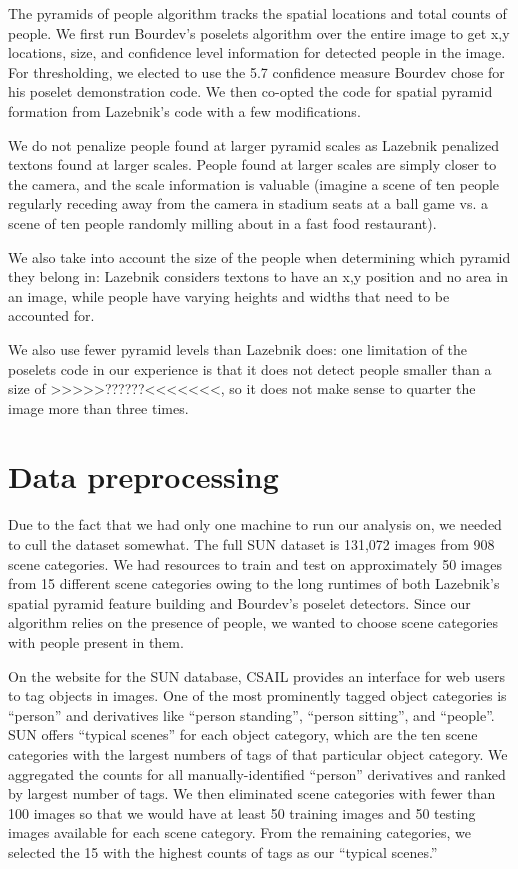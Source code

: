 \documentclass[11pt]{article}
\begin{document}
The pyramids of people algorithm tracks the spatial locations and total counts of people.  We first run Bourdev's poselets algorithm over the entire image to get x,y locations, size, and confidence level information for detected people in the image.  For thresholding, we elected to use the 5.7 confidence measure Bourdev chose for his poselet demonstration code.  We then co-opted the code for spatial pyramid formation from Lazebnik's code with a few modifications.

We do not penalize people found at larger pyramid scales as Lazebnik penalized textons found at larger scales.  People found at larger scales are simply closer to the camera, and the scale information is valuable (imagine a scene of ten people regularly receding away from the camera in stadium seats at a ball game vs. a scene of ten people randomly milling about in a fast food restaurant).

We also take into account the size of the people when determining which pyramid they belong in: Lazebnik considers textons to have an x,y position and no area in an image, while people have varying heights and widths that need to be accounted for.

We also use fewer pyramid levels than Lazebnik does: one limitation of the poselets code in our experience is that it does not detect people smaller than a size of >>>>>??????<<<<<<<, so it does not make sense to quarter the image more than three times.

\section{Data preprocessing}

Due to the fact that we had only one machine to run our analysis on, we needed to cull the dataset somewhat.  The full SUN dataset is 131,072 images from 908 scene categories.  We had resources to train and test on approximately 50 images from 15 different scene categories owing to the long runtimes of both Lazebnik's spatial pyramid feature building and Bourdev's poselet detectors.  Since our algorithm relies on the presence of people, we wanted to choose scene categories with people present in them.

On the website for the SUN database, CSAIL provides an interface for web users to tag objects in images.  One of the most prominently tagged object categories is ``person'' and derivatives like ``person standing'', ``person sitting'', and ``people''.  SUN offers ``typical scenes'' for each object category, which are the ten scene categories with the largest numbers of tags of that particular object category.  We aggregated the counts for all manually-identified ``person'' derivatives and ranked by largest number of tags.  We then eliminated scene categories with fewer than 100 images so that we would have at least 50 training images and 50 testing images available for each scene category.  From the remaining categories, we selected the 15 with the highest counts of tags as our ``typical scenes.''
\end{document}

